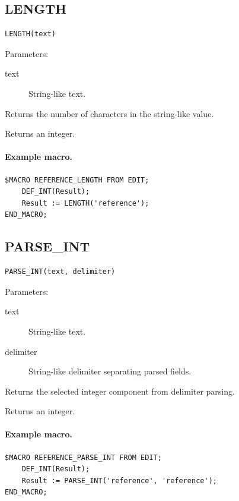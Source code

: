 \documentclass[a4paper,10pt,twoside,openany]{book}
\begin{document}
\label{prim:intrinsic-length}
\subsection*{LENGTH}
\begin{verbatim}
LENGTH(text)
\end{verbatim}
Parameters:
\begin{description}
\item[text] String-like text.
\end{description}

Returns the number of characters in the string-like value.

Returns an integer.

\paragraph{Example macro.}
\begin{verbatim}
$MACRO REFERENCE_LENGTH FROM EDIT;
    DEF_INT(Result);
    Result := LENGTH('reference');
END_MACRO;
\end{verbatim}

\label{prim:intrinsic-parse-int}
\subsection*{PARSE\_INT}
\begin{verbatim}
PARSE_INT(text, delimiter)
\end{verbatim}
Parameters:
\begin{description}
\item[text] String-like text.
\item[delimiter] String-like delimiter separating parsed fields.
\end{description}

Returns the selected integer component from delimiter parsing.

Returns an integer.

\paragraph{Example macro.}
\begin{verbatim}
$MACRO REFERENCE_PARSE_INT FROM EDIT;
    DEF_INT(Result);
    Result := PARSE_INT('reference', 'reference');
END_MACRO;
\end{verbatim}
\end{document}
